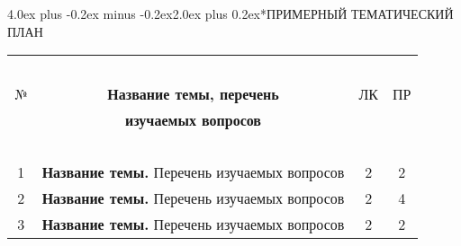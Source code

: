 \documentclass[12pt, a4paper]{book}%
\makeatletter
\renewcommand{\section}{\@startsection{section}{1}{1pt}%
{4.0ex plus -0.2ex minus -0.2ex}{2.0ex plus 0.2ex}{\centering\bf}}%
\makeatother
\begin{document}
{\section*{ПРИМЕРНЫЙ ТЕМАТИЧЕСКИЙ ПЛАН} %
{\normalsize%
\begin{center}%
\begin{longtable}{|c|p{12cm}|c|c|}%
\hline%
~ & ~ & ~ & ~  \\%
№ & \multicolumn{1}{|c|}{\bf Название  темы, перечень } & ЛК & ПР  \\%
~ & \multicolumn{1}{|c|}{\bf изучаемых вопросов}  & ~  &  ~ \\%
   ~ & ~ & ~ & ~  \\%
\hline%
1 & {\bf Название темы.} Перечень изучаемых вопросов & 2  & 2  \\
\hline %
2& {\bf Название темы.} Перечень изучаемых вопросов  & 2  & 4  \\
\hline %
3& {\bf Название темы.} Перечень изучаемых вопросов  & 2  & 2  \\

\end{longtable}
\end{center}}}
\end{document}
